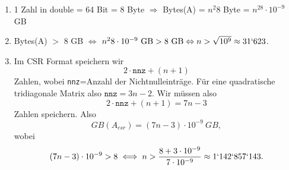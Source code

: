\begin{enumerate}
	\item 1 Zahl in double = 64 Bit = 8 Byte 
$\Rightarrow$  Bytes(A) = $n^2$8 Byte = $n^28\cdot10^{-9}$ GB
\item Bytes(A) $>$ 8 GB $\Leftrightarrow$ $n^28\cdot 10 ^{-9} ~\text{GB} > 8 ~\text{GB}  \Leftrightarrow n>\sqrt{ 10^9} \approx 31`623$. 
\item Im CSR Format speichern wir $$2\cdot \texttt{nnz} + (n+1)$$ Zahlen, wobei \texttt{nnz}=Anzahl der Nichtnulleinträge. Für eine quadratische tridiagonale Matrix also $\texttt{nnz}=3n-2$. Wir müssen also 
$$2\cdot \texttt{nnz} + (n+1) = 7n -3$$
Zahlen speichern. Also
$$GB(A_{csr})  = (7n-3)\cdot 10^{-9}~GB,$$
wobei 
$$(7n-3)\cdot 10^{-9} > 8 \iff n > \frac{8 + 3\cdot 10^{-9} }{7 \cdot 10^{-9} } \approx 1`142`857`143.$$
\end{enumerate}